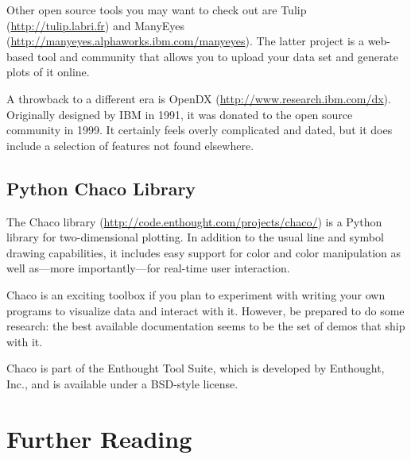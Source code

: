 Other open source tools you may want to check out are Tulip
(\url{http://tulip.labri.fr}) and ManyEyes
(\url{http://manyeyes.alphaworks.ibm.com/manyeyes}). The latter
project is a web-based tool and community that allows you to upload
your data set and generate plots of it online.

A throwback to a different era is OpenDX
(\url{http://www.research.ibm.com/dx}).  Originally designed by IBM in
1991, it was donated to the open source community in 1999. It
certainly feels overly complicated and dated, but it does include a
selection of features not found elsewhere.

\vspace*{-6pt}
\subsection{Python Chaco Library}

 
The Chaco library (\url{http://code.enthought.com/projects/chaco/}) is
a Python library for two-dimensional plotting. In addition\vadjust{\pagebreak} to the
usual line and symbol drawing capabilities, it includes easy support
for color and color manipulation as well as---more importantly---for
real-time user interaction.

Chaco is an exciting toolbox if you plan to experiment with writing
your own programs to visualize data and interact with it. However, be
prepared to do some research: the best available documentation seems
to be the set of demos that ship with it.

Chaco is part of the Enthought Tool Suite, which is developed by
Enthought, Inc., and is available under a BSD-style license.


\section{Further Reading}

